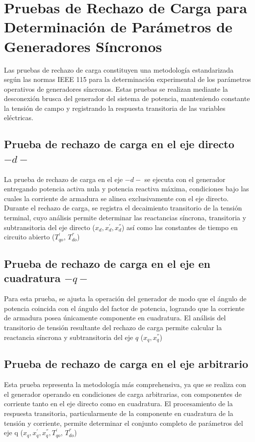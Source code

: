 \documentclass[conference]{IEEEtran}
\begin{document}
\section{Pruebas de Rechazo de Carga para Determinación de Parámetros de Generadores Síncronos} 

Las pruebas de rechazo de carga constituyen una metodología estandarizada según las normas IEEE 115
para la determinación experimental de los parámetros operativos de generadores síncronos. Estas pruebas
se realizan mediante la desconexión brusca del generador del sistema de potencia, manteniendo constante
la tensión de campo y registrando la respuesta transitoria de las variables eléctricas.

\subsection{Prueba de rechazo de carga en el eje directo $-d-$}

La prueba de rechazo de carga en el eje $-d-$ se ejecuta con el generador entregando potencia activa nula y potencia reactiva máxima,
condiciones bajo las cuales la corriente de armadura se alinea exclusivamente con el eje directo.
Durante el rechazo de carga, se registra el decaimiento transitorio de la tensión terminal, cuyo análisis
permite determinar las reactancias síncrona, transitoria y subtransitoria del eje directo ($x_d, x^{'}_d, x^{''}_d$) así como las constantes
de tiempo en circuito abierto ($T^{'}_{qo}$, $T^{''}_{do}$)

\subsection{Prueba de rechazo de carga en el eje en cuadratura $-q-$}

Para esta prueba, se ajusta la operación del generador de modo que el ángulo de potencia coincida con el ángulo del factor de potencia,
logrando que la corriente de armadura posea únicamente componente en cuadratura. El análisis del transitorio de tensión resultante del
rechazo de carga permite calcular la reactancia síncrona y subtransitoria del eje $q$ ($x_q, x^{''}_q$)

\subsection{Prueba de rechazo de carga en el eje arbitrario}

Esta prueba representa la metodología más comprehensiva, ya que se realiza con el generador operando en condiciones de carga arbitrarias,
con componentes de corriente tanto en el eje directo como en cuadratura. El procesamiento de la respuesta transitoria, particularmente de
la componente en cuadratura de la tensión y corriente, permite determinar el conjunto completo de parámetros del eje q 
($x_q, x^{'}_q, x^{''}_q, T^{'}_{qo}$, $T^{''}_{do}$)
\end{document}
